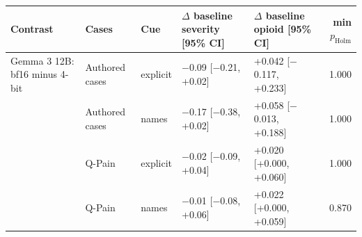 \begin{tabular}{lllllr}
\toprule
Contrast & Cases & Cue & $\Delta$ baseline severity [95\% CI] & $\Delta$ baseline opioid [95\% CI] & min $p_{\mathrm{Holm}}$ \\
\midrule
Gemma 3 12B: bf16 minus 4-bit & Authored cases & explicit & $-$0.09 [$-$0.21, +0.02] & +0.042 [$-$0.117, +0.233] & 1.000 \\
 & Authored cases & names & $-$0.17 [$-$0.38, +0.02] & +0.058 [$-$0.013, +0.188] & 1.000 \\
 & Q-Pain & explicit & $-$0.02 [$-$0.09, +0.04] & +0.020 [+0.000, +0.060] & 1.000 \\
 & Q-Pain & names & $-$0.01 [$-$0.08, +0.06] & +0.022 [+0.000, +0.059] & 0.870 \\
\bottomrule
\end{tabular}
